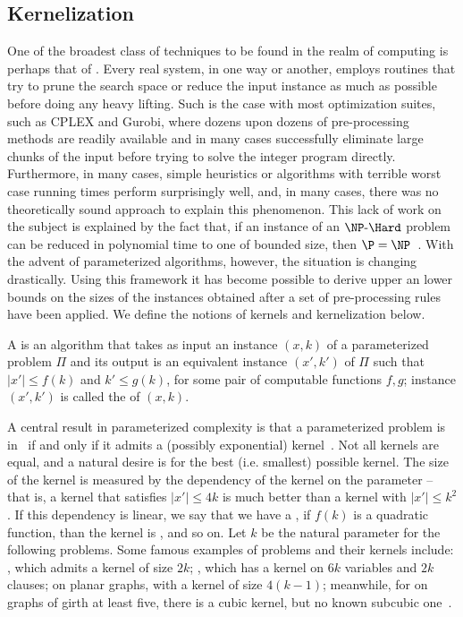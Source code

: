 \subsection{Kernelization}

One of the broadest class of techniques to be found in the realm of computing is perhaps that of .
Every real system, in one way or another, employs routines that try to prune the search space or reduce the input instance as much as possible before doing any heavy lifting.
Such is the case with most optimization suites, such as CPLEX and Gurobi, where dozens upon dozens of pre-processing methods are readily available and in many cases successfully eliminate large chunks of the input before trying to solve the integer program directly.
Furthermore, in many cases, simple heuristics or algorithms with terrible worst case running times perform surprisingly well, and, in many cases, there was no theoretically sound approach to explain this phenomenon.
This lack of work on the subject is explained by the fact that, if an instance of an $\NPH$ problem can be reduced in polynomial time to one of bounded size, then $\P = \NP$~\citep{book-kernels}.
With the advent of parameterized algorithms, however, the situation is changing drastically.
Using this framework it has become possible to derive upper an lower bounds on the sizes of the instances obtained after a set of pre-processing rules have been applied.
We define the notions of kernels and kernelization below.

\begin{class_definition*}[Kernelization]
    A   is an algorithm that takes as input an instance $(x,k)$ of a parameterized problem $\Pi$ and its output is an equivalent instance $(x',k')$ of $\Pi$ such that $|x'| \leq f(k)$ and $k' \leq g(k)$, for some pair of computable functions $f,g$; instance $(x',k')$ is called the  of $(x,k)$.
\end{class_definition*}

A central result in parameterized complexity is that a parameterized problem is in \FPT\ if and only if it admits a (possibly exponential) kernel~\cite{book-kernels}.
Not all kernels are equal, and a natural desire is for the best (i.e. smallest) possible kernel.
The size of the kernel is measured by the dependency of the kernel on the parameter -- that is, a kernel that satisfies $|x'| \leq 4k$ is much better than a kernel with $|x'| \leq k^2$.
If this dependency is linear, we say that we have a , if $f(k)$ is a quadratic function, than the kernel is , and so on.
Let $k$ be the natural parameter for the following problems.
Some famous examples of problems and their kernels include: , which admits a kernel of size $2k$; , which has a kernel on $6k$ variables and $2k$ clauses;  on planar graphs, with a kernel of size $4(k - 1)$;
meanwhile, for  on graphs of girth at least five, there is a cubic kernel, but no known subcubic one~\citep{cygan_parameterized, book-kernels}.

